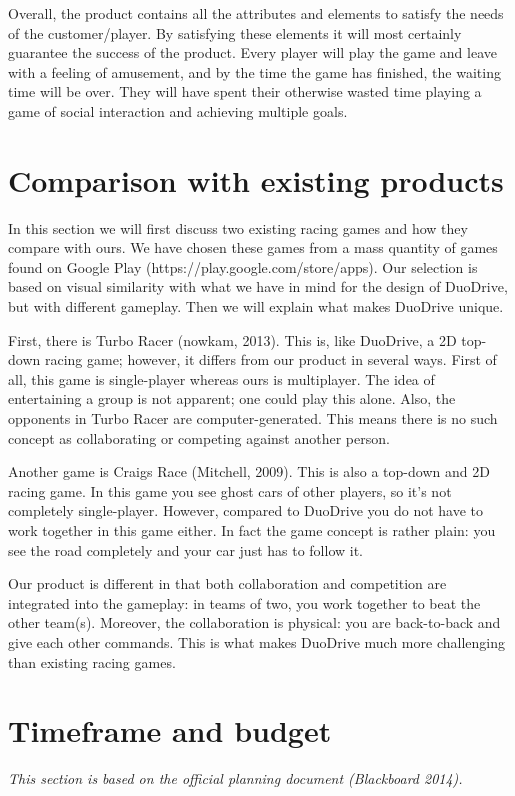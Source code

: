 \documentclass[11pt,twoside,a4paper]{article}
\begin{document}
Overall, the product contains all the attributes and elements to satisfy the needs of the customer/player. By satisfying these elements it will most certainly guarantee the success of the product. Every player will play the game and leave with a feeling of amusement, and by the time the game has finished, the waiting time will be over. They will have spent their otherwise wasted time playing a game of social interaction and achieving multiple goals.


\section{Comparison with existing products}
In this section we will first discuss two existing racing games and how they compare with ours. We have chosen these games from a mass quantity of games found on Google Play (https://play.google.com/store/apps). Our selection is based on visual similarity with what we have in mind for the design of DuoDrive, but with different gameplay. Then we will explain what makes DuoDrive unique.

First, there is Turbo Racer (nowkam, 2013). This is, like DuoDrive, a 2D top-down racing game; however, it differs from our product in several ways. First of all, this game is single-player whereas ours is multiplayer. The idea of entertaining a group is not apparent; one could play this alone. Also, the opponents in Turbo Racer are computer-generated. This means there is no such concept as collaborating or competing against another person.

Another game is Craigs Race (Mitchell, 2009). This is also a top-down and 2D racing game. In this game you see ghost cars of other players, so it's not completely single-player. However, compared to DuoDrive you do not have to work together in this game either. In fact the game concept is rather plain: you see the road completely and your car just has to follow it.

Our product is different in that both collaboration and competition are integrated into the gameplay: in teams of two, you work together to beat the other team(s). Moreover, the collaboration is physical: you are back-to-back and give each other commands. This is what makes DuoDrive much more challenging than existing racing games.


\section{Timeframe and budget}
{\itshape This section is based on the official planning document (Blackboard 2014).}
\end{document}
